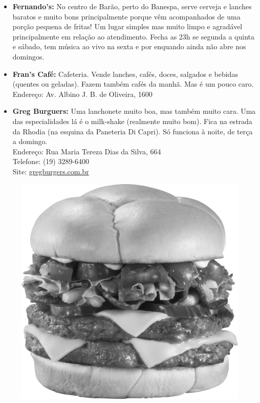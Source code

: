 \begin{itemize}
    \item   \textbf{Fernando's:} No centro de Barão, perto do Banespa, serve
        cerveja e lanches baratos e muito bons principalmente porque vêm
        acompanhados de uma porção pequena de fritas! Um lugar simples mas muito
        limpo e agradável principalmente em relação ao atendimento. Fecha as 23h
        se segunda a quinta e sábado, tem música ao vivo na sexta e por enquando
        ainda não abre nos domingos.

    \item   \textbf{Fran's Café:} Cafeteria. Vende lanches, cafés, doces,
        salgados e bebidas (quentes ou geladas). Fazem também cafés da manhã.
        Mas é um pouco caro.
        \\Endereço: Av. Albino J. B. de Oliveira, 1600 

    \item   \textbf{Greg Burguers:} Uma lanchonete muito boa, mas também muito
        cara.  Uma das especialidades lá é o milk-shake (realmente muito bom).
        Fica na estrada da Rhodia (na esquina da Paneteria Di Capri). Só
        funciona à noite, de terça a domingo.
        \\Endereço: Rua Maria Tereza Dias da Silva, 664
        \\Telefone: (19) 3289-6400
        \\Site: \url{gregburgers.com.br}
\end{itemize}

\begin{figure}[h!]
    \centering
    \includegraphics[width=.45\textwidth]{img/barao/burger.jpg}
\end{figure}

